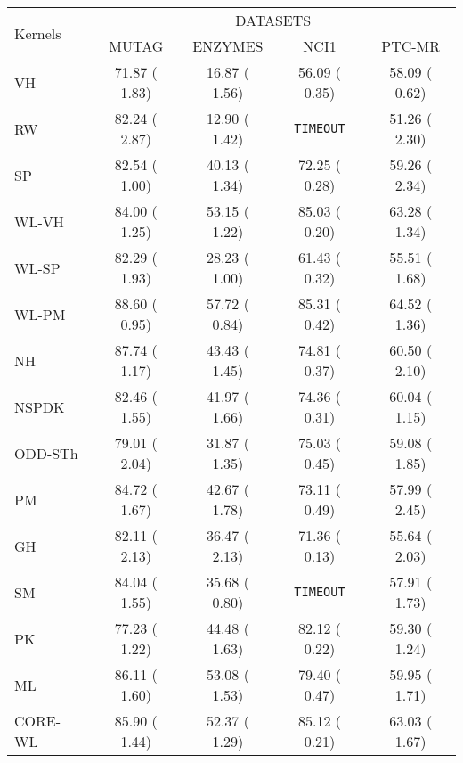 \documentclass[twoside,11pt]{article}
\begin{document}
\begin{table}[t]
\centering
\scriptsize
\begin{sc}
\def\arraystretch{1.1}
\begin{tabular}{lcccc} \hline
\multirow{3}{*}{Kernels} & \multicolumn{4}{c}{DATASETS} \\ \cline{2-5}
& \multirow{2}{*}{MUTAG} & \multirow{2}{*}{ENZYMES} & \multirow{2}{*}{NCI1} & \multirow{2}{*}{PTC-MR} \\
& & & & \\ \hline
VH & 71.87 {\tiny ( 1.83)} & 16.87 {\tiny ( 1.56)} & 56.09 {\tiny ( 0.35)} & 58.09 {\tiny ( 0.62)}  \\
RW & 82.24 {\tiny ( 2.87)} & 12.90 {\tiny ( 1.42)} & \texttt{TIMEOUT} & 51.26 {\tiny ( 2.30)} \\
SP & 82.54 {\tiny ( 1.00)} & 40.13 {\tiny ( 1.34)} & 72.25 {\tiny ( 0.28)} & 59.26 {\tiny ( 2.34)} \\
WL-VH & 84.00 {\tiny ( 1.25)} & 53.15 {\tiny ( 1.22)} & 85.03 {\tiny ( 0.20)} & 63.28 {\tiny ( 1.34)} \\
WL-SP & 82.29 {\tiny ( 1.93)} & 28.23 {\tiny ( 1.00)} & 61.43 {\tiny ( 0.32)} & 55.51 {\tiny ( 1.68)} \\
WL-PM & 88.60 {\tiny ( 0.95)} & 57.72 {\tiny ( 0.84)} & 85.31 {\tiny ( 0.42)} & 64.52 {\tiny ( 1.36)} \\
NH & 87.74 {\tiny ( 1.17)} & 43.43 {\tiny ( 1.45)} & 74.81 {\tiny ( 0.37)} & 60.50 {\tiny ( 2.10)} \\
NSPDK & 82.46 {\tiny ( 1.55)} & 41.97 {\tiny ( 1.66)} & 74.36 {\tiny ( 0.31)} & 60.04 {\tiny ( 1.15)} \\
ODD-STh & 79.01 {\tiny ( 2.04)} & 31.87 {\tiny ( 1.35)} & 75.03 {\tiny ( 0.45)} & 59.08 {\tiny ( 1.85)} \\
PM & 84.72 {\tiny ( 1.67)} & 42.67 {\tiny ( 1.78)} & 73.11 {\tiny ( 0.49)} & 57.99 {\tiny ( 2.45)} \\
GH & 82.11 {\tiny ( 2.13)} & 36.47 {\tiny ( 2.13)} & 71.36 {\tiny ( 0.13)} & 55.64 {\tiny ( 2.03)} \\
SM & 84.04 {\tiny ( 1.55)} & 35.68 {\tiny ( 0.80)} & \texttt{TIMEOUT} & 57.91 {\tiny ( 1.73)} \\
PK & 77.23 {\tiny ( 1.22)} & 44.48 {\tiny ( 1.63)} & 82.12 {\tiny ( 0.22)} & 59.30 {\tiny ( 1.24)} \\
ML & 86.11 {\tiny ( 1.60)} & 53.08 {\tiny ( 1.53)} & 79.40 {\tiny ( 0.47)} & 59.95 {\tiny ( 1.71)} \\
CORE-WL & 85.90 {\tiny ( 1.44)} & 52.37 {\tiny ( 1.29)} & 85.12 {\tiny ( 0.21)} & 63.03 {\tiny ( 1.67)} \\

\end{tabular}
\end{sc}
\end{table}
\end{document}
